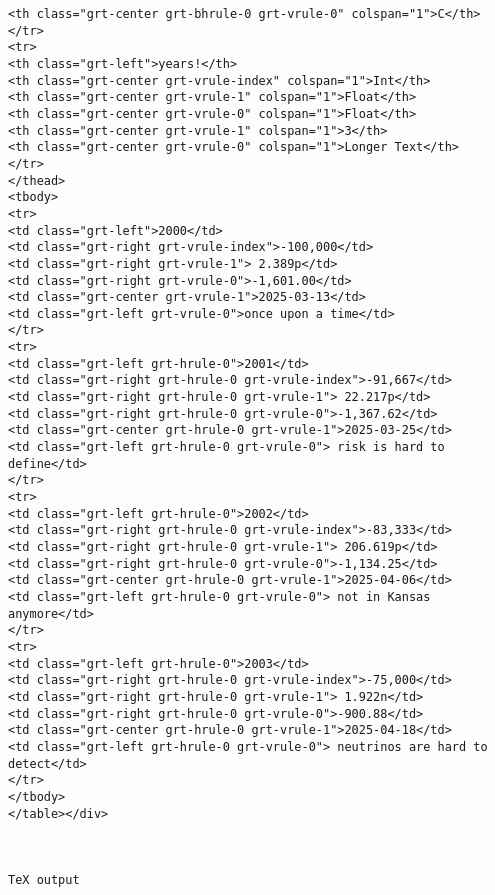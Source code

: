 \documentclass[
  12pt,
  a4paper,
  DIV=11,
  numbers=noendperiod]{scrartcl}
\begin{document}
\begin{verbatim}
<th class="grt-center grt-bhrule-0 grt-vrule-0" colspan="1">C</th>
</tr>
<tr>
<th class="grt-left">years!</th>
<th class="grt-center grt-vrule-index" colspan="1">Int</th>
<th class="grt-center grt-vrule-1" colspan="1">Float</th>
<th class="grt-center grt-vrule-0" colspan="1">Float</th>
<th class="grt-center grt-vrule-1" colspan="1">3</th>
<th class="grt-center grt-vrule-0" colspan="1">Longer Text</th>
</tr>
</thead>
<tbody>
<tr>
<td class="grt-left">2000</td>
<td class="grt-right grt-vrule-index">-100,000</td>
<td class="grt-right grt-vrule-1"> 2.389p</td>
<td class="grt-right grt-vrule-0">-1,601.00</td>
<td class="grt-center grt-vrule-1">2025-03-13</td>
<td class="grt-left grt-vrule-0">once upon a time</td>
</tr>
<tr>
<td class="grt-left grt-hrule-0">2001</td>
<td class="grt-right grt-hrule-0 grt-vrule-index">-91,667</td>
<td class="grt-right grt-hrule-0 grt-vrule-1"> 22.217p</td>
<td class="grt-right grt-hrule-0 grt-vrule-0">-1,367.62</td>
<td class="grt-center grt-hrule-0 grt-vrule-1">2025-03-25</td>
<td class="grt-left grt-hrule-0 grt-vrule-0"> risk is hard to define</td>
</tr>
<tr>
<td class="grt-left grt-hrule-0">2002</td>
<td class="grt-right grt-hrule-0 grt-vrule-index">-83,333</td>
<td class="grt-right grt-hrule-0 grt-vrule-1"> 206.619p</td>
<td class="grt-right grt-hrule-0 grt-vrule-0">-1,134.25</td>
<td class="grt-center grt-hrule-0 grt-vrule-1">2025-04-06</td>
<td class="grt-left grt-hrule-0 grt-vrule-0"> not in Kansas anymore</td>
</tr>
<tr>
<td class="grt-left grt-hrule-0">2003</td>
<td class="grt-right grt-hrule-0 grt-vrule-index">-75,000</td>
<td class="grt-right grt-hrule-0 grt-vrule-1"> 1.922n</td>
<td class="grt-right grt-hrule-0 grt-vrule-0">-900.88</td>
<td class="grt-center grt-hrule-0 grt-vrule-1">2025-04-18</td>
<td class="grt-left grt-hrule-0 grt-vrule-0"> neutrinos are hard to detect</td>
</tr>
</tbody>
</table></div>



TeX output



\end{verbatim}
\end{document}
